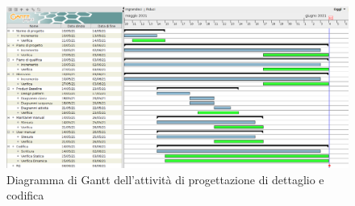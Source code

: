 \begin{figure}[!ht]
    \caption{Diagramma di Gantt dell'attività di progettazione di dettaglio e codifica}
    \vspace{5px}
    \includegraphics[scale=0.22]{../../../Images/Diagrammi/Gantt/progettazioneCodifica_v3.png}
    \centering
\end{figure}

